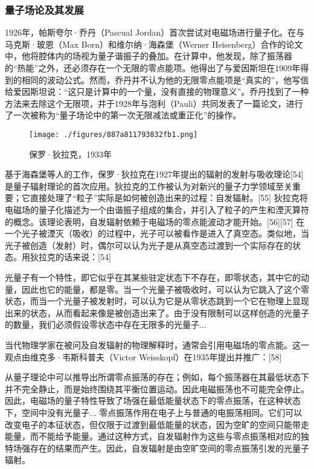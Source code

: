 \subsubsection{量子场论及其发展} 
1926年，帕斯夸尔·乔丹（Pascual Jordan）首次尝试对电磁场进行量子化。在与马克斯·玻恩（Max Born）和维尔纳·海森堡（Werner Heisenberg）合作的论文中，他将腔体内的场视为量子谐振子的叠加。在计算中，他发现，除了振荡器的“热能”之外，还必须存在一个无限的零点能项。他得出了与爱因斯坦在1909年得到的相同的波动公式。然而，乔丹并不认为他的无限零点能项是“真实的”，他写信给爱因斯坦说：“这只是计算中的一个量，没有直接的物理意义”。乔丹找到了一种方法来去除这个无限项，并于1928年与泡利（Pauli）共同发表了一篇论文，进行了一次被称为“量子场论中的第一次无限减法或重正化”的操作。
\begin{figure}[ht]
\centering
\texttt{[image: ./figures/887a811793832fb1.png]}
\caption{保罗·狄拉克，1933年} \label{fig_LD_8}
\end{figure}
基于海森堡等人的工作，保罗·狄拉克在1927年提出的辐射的发射与吸收理论[54] 是量子辐射理论的首次应用。狄拉克的工作被认为对新兴的量子力学领域至关重要；它直接处理了“粒子”实际是如何被创造出来的过程：自发辐射。[55] 狄拉克将电磁场的量子化描述为一个由谐振子组成的集合，并引入了粒子的产生和湮灭算符的概念。该理论表明，自发辐射依赖于电磁场的零点能波动才能开始。[56][57] 在一个光子被湮灭（吸收）的过程中，光子可以被看作是进入了真空态。类似地，当光子被创造（发射）时，偶尔可以认为光子是从真空态过渡到一个实际存在的状态。用狄拉克的话来说：[54]

光量子有一个特性，即它似乎在其某些驻定状态下不存在，即零状态，其中它的动量，因此也它的能量，都是零。当一个光量子被吸收时，可以认为它跳入了这个零状态，而当一个光量子被发射时，可以认为它是从零状态跳到一个它在物理上显现出来的状态，从而看起来像是被创造出来了。由于没有限制可以这样创造的光量子的数量，我们必须假设零状态中存在无限多的光量子...

当代物理学家在被问及自发辐射的物理解释时，通常会引用电磁场的零点能。这一观点由维克多·韦斯科普夫（Victor Weisskopf）在1935年提出并推广：[58]

从量子理论中可以推导出所谓零点振荡的存在；例如，每个振荡器在其最低状态下并不完全静止，而是始终围绕其平衡位置运动。因此电磁振荡也不可能完全停止。因此，电磁场的量子特性导致了场强在最低能量状态下的零点振荡，在这种状态下，空间中没有光量子... 零点振荡作用在电子上与普通的电振荡相同。它们可以改变电子的本征状态，但仅限于过渡到最低能量的状态，因为空旷的空间只能带走能量，而不能给予能量。通过这种方式，自发辐射作为这些与零点振荡相对应的独特场强存在的结果而产生。因此，自发辐射是由空旷空间的零点振荡引发的光量子辐射。

